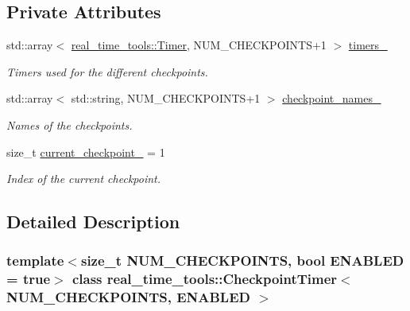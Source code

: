 \subsection*{Private Attributes}
\begin{DoxyCompactItemize}
\item 
std\+::array$<$ \hyperlink{classreal__time__tools_1_1Timer}{real\+\_\+time\+\_\+tools\+::\+Timer}, N\+U\+M\+\_\+\+C\+H\+E\+C\+K\+P\+O\+I\+N\+TS+1 $>$ \hyperlink{classreal__time__tools_1_1CheckpointTimer_a0abbead69aaf780b649f6af01f50cc62}{timers\+\_\+}
\begin{DoxyCompactList}\small\item\em Timers used for the different checkpoints. \end{DoxyCompactList}\item 
\mbox{\label{classreal__time__tools_1_1CheckpointTimer_afbb3abc9e62174d6046f6abb294a120f}} 
std\+::array$<$ std\+::string, N\+U\+M\+\_\+\+C\+H\+E\+C\+K\+P\+O\+I\+N\+TS+1 $>$ \hyperlink{classreal__time__tools_1_1CheckpointTimer_afbb3abc9e62174d6046f6abb294a120f}{checkpoint\+\_\+names\+\_\+}
\begin{DoxyCompactList}\small\item\em Names of the checkpoints. \end{DoxyCompactList}\item 
\mbox{\label{classreal__time__tools_1_1CheckpointTimer_a07ae61ac85e755629625cc32416f2631}} 
size\+\_\+t \hyperlink{classreal__time__tools_1_1CheckpointTimer_a07ae61ac85e755629625cc32416f2631}{current\+\_\+checkpoint\+\_\+} = 1
\begin{DoxyCompactList}\small\item\em Index of the current checkpoint. \end{DoxyCompactList}\end{DoxyCompactItemize}


\subsection{Detailed Description}
\subsubsection*{template$<$size\+\_\+t N\+U\+M\+\_\+\+C\+H\+E\+C\+K\+P\+O\+I\+N\+TS, bool E\+N\+A\+B\+L\+ED = true$>$\newline
class real\+\_\+time\+\_\+tools\+::\+Checkpoint\+Timer$<$ N\+U\+M\+\_\+\+C\+H\+E\+C\+K\+P\+O\+I\+N\+T\+S, E\+N\+A\+B\+L\+E\+D $>$}

